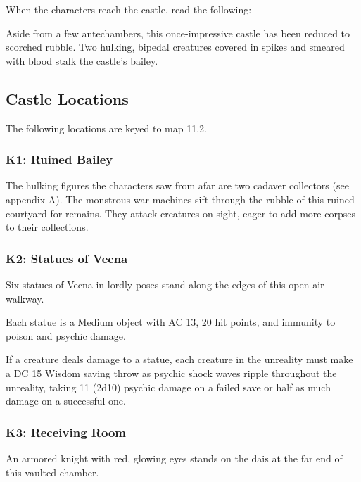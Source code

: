 \documentclass[10pt,a4paper,twoside,bg=print,twocolumn,openany,nodeprecatedcode]{dndbook}
\begin{document}
When the characters reach the castle, read the following:

\begin{DndReadAloud}{}
Aside from a few antechambers, this once-impressive castle has been reduced to scorched rubble. Two hulking, bipedal creatures covered in spikes and smeared with blood stalk the castle's bailey.

\end{DndReadAloud}

\subsection{Castle Locations}
The following locations are keyed to map 11.2.

\subsubsection{K1: Ruined Bailey}
The hulking figures the characters saw from afar are two cadaver collectors (see appendix A). The monstrous war machines sift through the rubble of this ruined courtyard for remains. They attack creatures on sight, eager to add more corpses to their collections.

\subsubsection{K2: Statues of Vecna}
\begin{DndReadAloud}{}
Six statues of Vecna in lordly poses stand along the edges of this open-air walkway.

\end{DndReadAloud}

Each statue is a Medium object with AC 13, 20 hit points, and immunity to poison and psychic damage.

If a creature deals damage to a statue, each creature in the unreality must make a DC 15 Wisdom saving throw as psychic shock waves ripple throughout the unreality, taking 11 (2d10) psychic damage on a failed save or half as much damage on a successful one.

\subsubsection{K3: Receiving Room}
\begin{DndReadAloud}{}
An armored knight with red, glowing eyes stands on the dais at the far end of this vaulted chamber.

\end{DndReadAloud}
\end{document}
